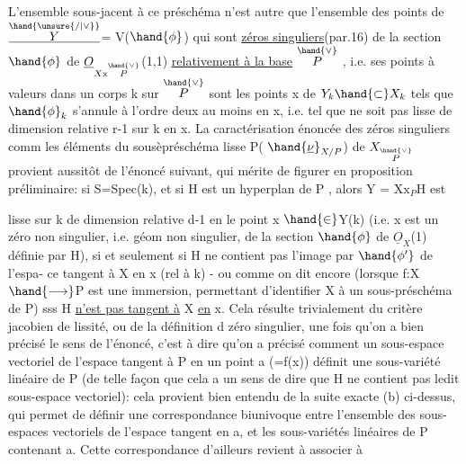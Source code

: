 
\placedmargin{$|$}L'ensemble sous-jacent à ce préschéma n'est autre que l'ensemble des
points de $\underline{\overset{\hand{\unsure{/|\vee}}}{Y}}$= V($\hand{\phi}$) qui sont \uline{zéros singuliers}(par.16) de la section $\hand{\phi}$ de
$\underline{O}_{X\mathrm{x}\overset{\hand{\vee}}{P}}$(1,1) \uline{relativement à la base} $\overset{\hand{\vee}}{P}$ , i.e. ses points  à valeurs dans
un corps k sur $\overset{\hand{\vee}}{P}$ sont les points x de $Y_k\hand{\subset} X_k$ tels que 
 $\hand{\phi}_k$ s'annule à l'ordre deux au moins
en x, i.e. tel que  ne soit pas lisse de dimension relative r-1
sur k en x. La caractérisation énoncée des  zéros singuliers comm
les éléments du sousèpréschéma lisse P( $\hand{\underline{\nu}}_{X/P}$) de $X_{\overset{\hand{\vee}}{P}}$ provient aussitôt
de l'énoncé suivant, qui mérite de figurer en proposition préliminaire:
si S=Spec(k), et si H est un hyperplan de P , alors Y = X$\mathrm{x}_P$H est

 lisse sur k de
dimension relative d-1 en le point x $\hand{\in}$Y(k) (i.e. x est un zéro non
singulier, i.e. géom non singulier, de la section $\hand{\phi}$ de $\underline{O}_X$(1) définie
par H), si et seulement si H ne contient pas l'image par $\hand{\phi'}$ de l'espa-%
ce tangent à X en x (rel à k) - ou  comme on dit encore
(lorsque f:X$\hand{\longrightarrow}$P est une immersion, permettant d'identifier X à un
sous-préschéma de P) sss H \uline{n'est pas tangent à} X \uline{en} x. Cela résulte
trivialement du critère jacobien de lissité, ou de la définition d
zéro singulier, une fois qu'on a bien précisé le sens de l'énoncé,
c'est à dire qu'on a précisé comment un  sous-espace
\placedmargin{$|$}vectoriel de l'espace tangent à P en un point a (=f(x)) définit une
sous-variété linéaire de P (de telle façon que cela a un sens de dire
que H ne contient pas ledit sous-espace vectoriel): cela provient
bien entendu de la suite exacte (b) ci-dessus, qui permet de
définir une correspondance biunivoque entre l'ensemble des sous-espaces
vectoriels de l'espace tangent en a, et les sous-variétés linéaires de
P contenant a. Cette correspondance d'ailleurs revient à associer à

